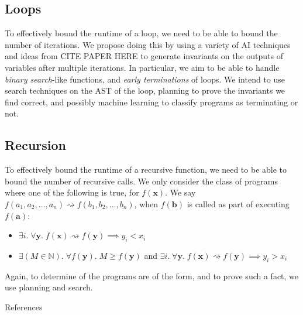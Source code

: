 \documentclass{mfcs}
\begin{document}
{\color{colour}\subsection{Loops}}

To effectively bound the runtime of a loop, we need to be able to bound the number of iterations.  We propose doing this by
using a variety of AI techniques and ideas from CITE PAPER HERE to generate invariants on the outputs of variables after
multiple iterations.  In particular, we aim to be able to handle \emph{binary search}-like functions, and \emph{early terminations}
of loops.  We intend to use search techniques on the AST of the loop, planning to prove the invariants we find correct, and possibly
machine learning to classify programs as terminating or not.

{\color{colour}\subsection{Recursion}}

To effectively bound the runtime of a recursive function, we need to be able to bound the number of recursive calls.  We only consider
the class of programs where one of the following is true, for $f(\textbf{x})$.  We say $f(a_1, a_2, \dots, a_n) \rightsquigarrow f(b_1, b_2, \dots, b_n)$, when
$f(\textbf{b})$ is called as part of executing $f(\textbf{a})$:
\begin{itemize}
    \item $\exists i.\; \forall \textbf{y}.\; f(\textbf{x}) \rightsquigarrow f(\textbf{y}) \implies y_i < x_i$
    \item $\exists (M \in \mathbb{N}).\; \forall f(\textbf{y}).\; M \geq f(\textbf{y})$ and $\exists i.\; \forall \textbf{y}.\; f(\textbf{x}) \rightsquigarrow f(\textbf{y}) \implies y_i > x_i$
\end{itemize}

Again, to determine of the programs are of the form, and to prove such a fact, we use planning and search.

\begin{question}{References}
    \printbibliography[heading=none]
\end{question}
\end{document}
